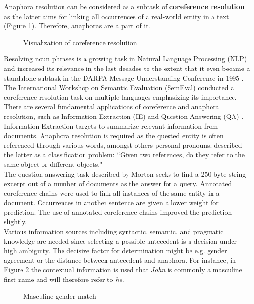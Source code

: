 Anaphora resolution can be considered as a subtask of \textbf{coreference resolution} as the latter aims for linking all occurrences of a real-world entity in a text (Figure \ref{figure:visofcoref}). Therefore, anaphoras are a part of it. 

\begin{figure}[h]
	\centering\sffamily
		\caption{Visualization of coreference resolution}
	\label{figure:visofcoref}
\end{figure}

Resolving noun phrases is a growing task in Natural Language Processing (NLP) and increased its relevance in the last decades to the extent that it even became a standalone subtask in the DARPA Message Understanding Conference in 1995 \citep{chinchor1995message}. The International Workshop on Semantic Evaluation (SemEval) conducted a coreference resolution task on multiple languages \citep{recasens2010semeval} emphasizing its importance. 
There are several fundamental applications of coreference and anaphora resolution, such as Information Extraction (IE) \citep{mccarthy1995using} and Question Answering (QA) \citep{morton2000coreference}.\\ 
Information Extraction targets to summarize relevant information from documents. Anaphora resolution is required as the quested entity is often referenced through various words, amongst others personal pronouns. \cite{mccarthy1995using} described the latter as a classification problem: ``Given two references, do they refer to the same object or different objects."\\
The question answering task described by Morton seeks to find a 250 byte string excerpt out of a number of documents as the answer for a query. Annotated coreference chains were used to link all instances of the same entity in a document. Occurrences in another sentence are given a lower weight for prediction. The use of annotated coreference chains improved the prediction slightly.\\
Various information sources including syntactic, semantic, and pragmatic knowledge are needed since selecting a possible antecedent is a decision under high ambiguity. The decisive factor for determination might be e.g. gender agreement or the distance between antecedent and anaphora. For instance, in Figure \ref{figure:mascmatch} the contextual information is used that \textit{John} is commonly a masculine first name and will therefore refer to \textit{he}.
\begin{figure}[h]
\centering\sffamily
\caption{Masculine gender match}
	\label{figure:mascmatch}
\end{figure}

